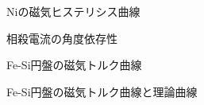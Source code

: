 \documentclass[uplatex,a4j,11pt,dvipdfmx]{jsarticle}
\begin{document}
%
%
%
%
%
%

\begin{figure}
  \begin{center}
    
    \caption{Niの磁気ヒステリシス曲線}
  \end{center}
\end{figure}

\begin{figure}
  \begin{center}
    
    \caption{相殺電流の角度依存性}
  \end{center}
\end{figure}

\begin{figure}
  \begin{center}
    
    \caption{Fe-Si円盤の磁気トルク曲線}
  \end{center}
\end{figure}

\begin{figure}
  \begin{center}
    
    \caption{Fe-Si円盤の磁気トルク曲線と理論曲線}
  \end{center}
\end{figure}

\begin{figure}
  \begin{center}
    
  \end{center}
\end{figure}


\end{document}
